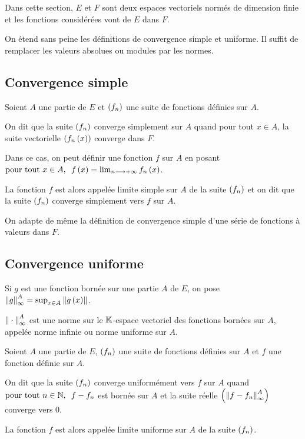 Dans cette section, \(E\) et \(F\) sont deux espaces vectoriels normés de dimension finie et les fonctions considérées vont de \(E\) dans \(F\).

On étend sans peine les définitions de convergence simple et uniforme. Il suffit de remplacer les valeurs absolues ou modules par les normes.

\subsection{Convergence simple}

\begin{defi}
Soient \(A\) une partie de \(E\) et \(\left(f_n\right)\) une suite de fonctions définies sur \(A\).

On dit que la suite \(\left(f_n\right)\) converge simplement sur \(A\) quand pour tout \(x\in A\), la suite vectorielle \(\left(f_n\left(x\right)\right)\) converge dans \(F\).

Dans ce cas, on peut définir une fonction \(f\) sur \(A\) en posant \(\quantifs{\tpt x\in A}f\paren{x}=\lim_{n\to\pinf}f_n\paren{x}\).

La fonction \(f\) est alors appelée limite simple sur \(A\) de la suite \(\left(f_n\right)\) et on dit que la suite \(\left(f_n\right)\) converge simplement vers \(f\) sur \(A\).
\end{defi}

On adapte de même la définition de convergence simple d'une série de fonctions à valeurs dans \(F\).

\subsection{Convergence uniforme}

\begin{rappel}
Si \(g\) est une fonction bornée sur une partie \(A\) de \(E\), on pose \(\norme{g}_\infty^A=\sup_{x\in A}\norme{g\paren{x}}\).

\(\norme{}_\infty^A\) est une norme sur le \(\mathbb{K}\)-espace vectoriel des fonctions bornées sur \(A\), appelée norme infinie ou norme uniforme sur \(A\).
\end{rappel}

\begin{defi}
Soient \(A\) une partie de \(E\), \(\left(f_n\right)\) une suite de fonctions définies sur \(A\) et \(f\) une fonction définie sur \(A\).

On dit que la suite \(\left(f_n\right)\) converge uniformément vers \(f\) sur \(A\) quand \(\quantifs{\tpt n\in\N}f-f_n\) est bornée sur \(A\) et la suite réelle \(\paren{\norme{f-f_n}_\infty^A}\) converge vers \(0\).

La fonction \(f\) est alors appelée limite uniforme sur \(A\) de la suite \(\left(f_n\right)\).
\end{defi}

